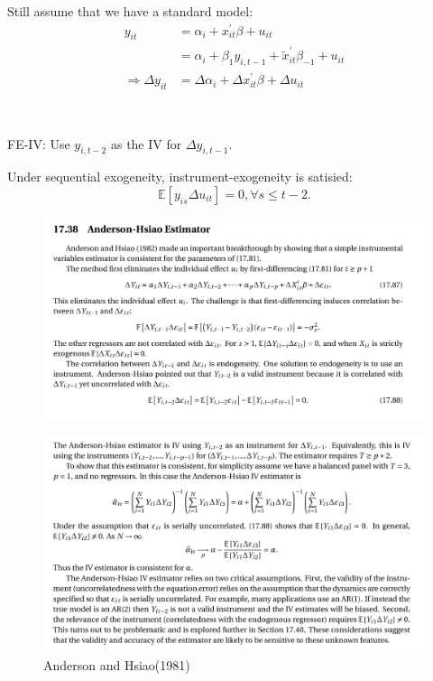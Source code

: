 Still assume that we have a standard model:
\begin{align*}
    y_{it} &= \alpha_i + x_{it}^{\prime} \beta + u_{it} \\
    &= \alpha_i + \beta_1 y_{i, t-1} + \tilde{x}_{it}^{\prime} \beta_{-1} + u_{it}  \\
    \Rightarrow \Delta y_{it} &= \Delta \alpha_i + \Delta x_{it}^{\prime} \beta + \Delta u_{it}
\end{align*}
\begin{definition}
    \

    FE-IV: Use $y_{i,t-2}$ as the IV for $\Delta y_{i,t-1}$.

    Under sequential exogeneity, instrument-exogeneity is satisied:
    \[\mathbb{E}[y_{is} \Delta u_{it}] = 0, \forall s\leq t-2.\]
\end{definition}

\begin{figure}[htbp!]
    \centering
    \includegraphics[width=\linewidth]{figures/Anderson-Hsiao-1981.png}
\end{figure}
\begin{figure}
    \centering
    \includegraphics[width=\linewidth]{figures/Anderson-Hsiao-1981-2.png}
    \caption{Anderson and Hsiao(1981)}
\end{figure}

